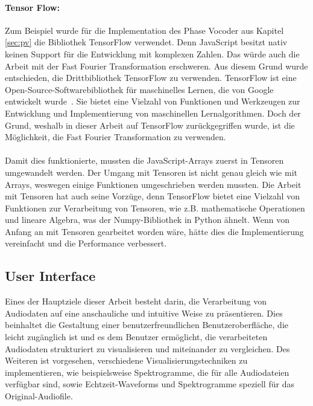 \paragraph{Tensor Flow:}
Zum Beispiel wurde für die Implementation des Phase Vocoder aus Kapitel \ref{sec:pv} die Bibliothek TensorFlow verwendet. Denn JavaScript besitzt nativ keinen Support für die Entwicklung mit komplexen Zahlen. Das würde auch die Arbeit mit der Fast Fourier Transformation erschweren. Aus diesem Grund wurde entschieden, die Drittbibliothek TensorFlow zu verwenden. TensorFlow ist eine Open-Source-Softwarebibliothek für maschinelles Lernen, die von Google entwickelt wurde~\cite{Abadi2016TensorFlowLM}. Sie bietet eine Vielzahl von Funktionen und Werkzeugen zur Entwicklung und Implementierung von maschinellen Lernalgorithmen. Doch der Grund, weshalb in dieser Arbeit auf TensorFlow zurückgegriffen wurde, ist die Möglichkeit, die Fast Fourier Transformation zu verwenden. 

\paragraph{}
Damit dies funktionierte, mussten die JavaScript-Arrays zuerst in Tensoren umgewandelt werden. Der Umgang mit Tensoren ist nicht genau gleich wie mit Arrays, weswegen einige Funktionen umgeschrieben werden mussten. Die Arbeit mit Tensoren hat auch seine Vorzüge, denn TensorFlow bietet eine Vielzahl von Funktionen zur Verarbeitung von Tensoren, wie z.B. mathematische Operationen und lineare Algebra, was der Numpy-Bibliothek in Python ähnelt. Wenn von Anfang an mit Tensoren gearbeitet worden wäre, hätte dies die Implementierung vereinfacht und die Performance verbessert.

\subsection{User Interface}
Eines der Hauptziele dieser Arbeit besteht darin, die Verarbeitung von Audiodaten auf eine anschauliche und intuitive Weise zu präsentieren. Dies beinhaltet die Gestaltung einer benutzerfreundlichen Benutzeroberfläche, die leicht zugänglich ist und es dem Benutzer ermöglicht, die verarbeiteten Audiodaten strukturiert zu visualisieren und miteinander zu vergleichen. Des Weiteren ist vorgesehen, verschiedene Visualisierungstechniken zu implementieren, wie beispielsweise Spektrogramme, die für alle Audiodateien verfügbar sind, sowie Echtzeit-Waveforms und Spektrogramme speziell für das Original-Audiofile.

